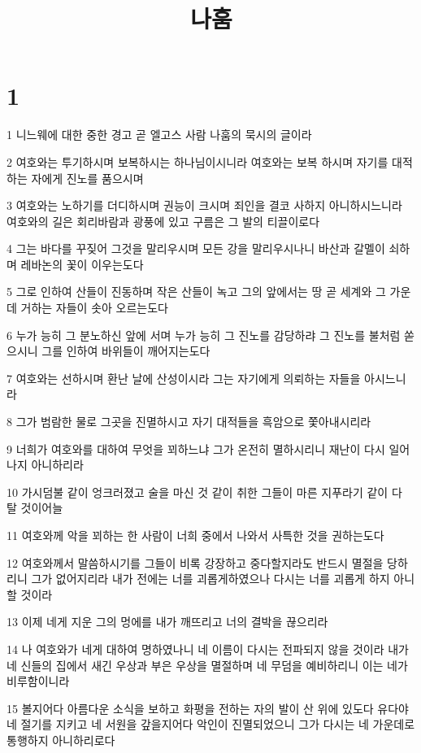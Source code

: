 

\title{나훔}


\chapter{1}

\par 1 니느웨에 대한 중한 경고 곧 엘고스 사람 나훔의 묵시의 글이라
\par 2 여호와는 투기하시며 보복하시는 하나님이시니라 여호와는 보복 하시며 자기를 대적하는 자에게 진노를 품으시며
\par 3 여호와는 노하기를 더디하시며 권능이 크시며 죄인을 결코 사하지 아니하시느니라 여호와의 길은 회리바람과 광풍에 있고 구름은 그 발의 티끌이로다
\par 4 그는 바다를 꾸짖어 그것을 말리우시며 모든 강을 말리우시나니 바산과 갈멜이 쇠하며 레바논의 꽃이 이우는도다
\par 5 그로 인하여 산들이 진동하며 작은 산들이 녹고 그의 앞에서는 땅 곧 세계와 그 가운데 거하는 자들이 솟아 오르는도다
\par 6 누가 능히 그 분노하신 앞에 서며 누가 능히 그 진노를 감당하랴 그 진노를 불처럼 쏟으시니 그를 인하여 바위들이 깨어지는도다
\par 7 여호와는 선하시며 환난 날에 산성이시라 그는 자기에게 의뢰하는 자들을 아시느니라
\par 8 그가 범람한 물로 그곳을 진멸하시고 자기 대적들을 흑암으로 쫓아내시리라
\par 9 너희가 여호와를 대하여 무엇을 꾀하느냐 그가 온전히 멸하시리니 재난이 다시 일어나지 아니하리라
\par 10 가시덤불 같이 엉크러졌고 술을 마신 것 같이 취한 그들이 마른 지푸라기 같이 다 탈 것이어늘
\par 11 여호와께 악을 꾀하는 한 사람이 너희 중에서 나와서 사특한 것을 권하는도다
\par 12 여호와께서 말씀하시기를 그들이 비록 강장하고 중다할지라도 반드시 멸절을 당하리니 그가 없어지리라 내가 전에는 너를 괴롭게하였으나 다시는 너를 괴롭게 하지 아니할 것이라
\par 13 이제 네게 지운 그의 멍에를 내가 깨뜨리고 너의 결박을 끊으리라
\par 14 나 여호와가 네게 대하여 명하였나니 네 이름이 다시는 전파되지 않을 것이라 내가 네 신들의 집에서 새긴 우상과 부은 우상을 멸절하며 네 무덤을 예비하리니 이는 네가 비루함이니라
\par 15 볼지어다 아름다운 소식을 보하고 화평을 전하는 자의 발이 산 위에 있도다 유다야 네 절기를 지키고 네 서원을 갚을지어다 악인이 진멸되었으니 그가 다시는 네 가운데로 통행하지 아니하리로다

